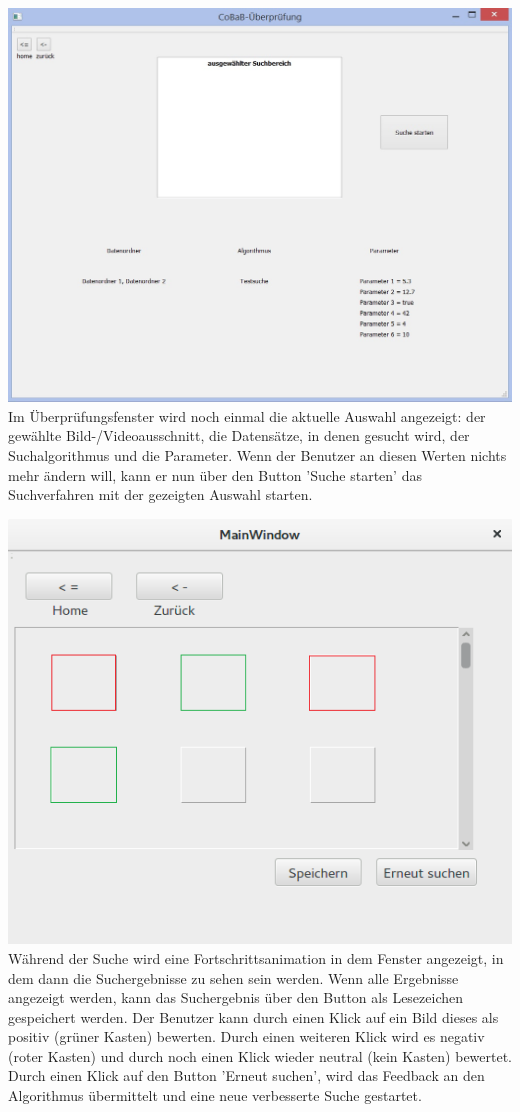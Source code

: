 \includegraphics[width=1\linewidth]{img/Ueberpruefung}
Im Überprüfungsfenster wird noch einmal die aktuelle Auswahl angezeigt: der gewählte Bild-/Videoausschnitt, die Datensätze, in denen gesucht wird, der Suchalgorithmus und die Parameter. Wenn der Benutzer an diesen Werten nichts mehr ändern will, kann er nun über den Button 'Suche starten' das Suchverfahren mit der gezeigten Auswahl starten.

\includegraphics[width=1\linewidth]{img/Suchergebnisse}
Während der Suche wird eine Fortschrittsanimation in dem Fenster angezeigt, in dem dann die Suchergebnisse zu sehen sein werden. Wenn alle Ergebnisse angezeigt werden, kann das Suchergebnis über den Button als Lesezeichen gespeichert werden.\newline 
Der Benutzer kann durch einen Klick auf ein Bild dieses als positiv (grüner Kasten) bewerten. Durch einen weiteren Klick wird es negativ (roter Kasten) und durch noch einen Klick wieder neutral (kein Kasten) bewertet. Durch einen Klick auf den Button 'Erneut suchen', wird das Feedback an den Algorithmus übermittelt und eine neue verbesserte Suche gestartet.
\pagebreak
